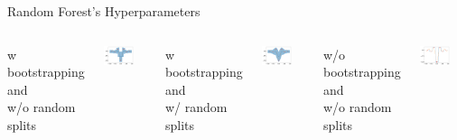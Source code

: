 \begin{frame}[c,fragile]{Random Forest's Hyperparameters}

\begin{columns}
	
	\centering
	w bootstrapping and\\ w/o random splits
	
	\includegraphics[width=0.7\textwidth]{images/rf_boot_middle_split.png}
	
	
	w bootstrapping and\\ w/ random splits
	
	\includegraphics[width=0.7\textwidth]{images/rf_boot_rand_split.png}

	

	\centering
	w/o bootstrapping and\\ w/o random splits
	
	\includegraphics[width=0.7\textwidth]{images/rf_noboot_middle_split.png}
	

\end{columns}
\end{frame}
